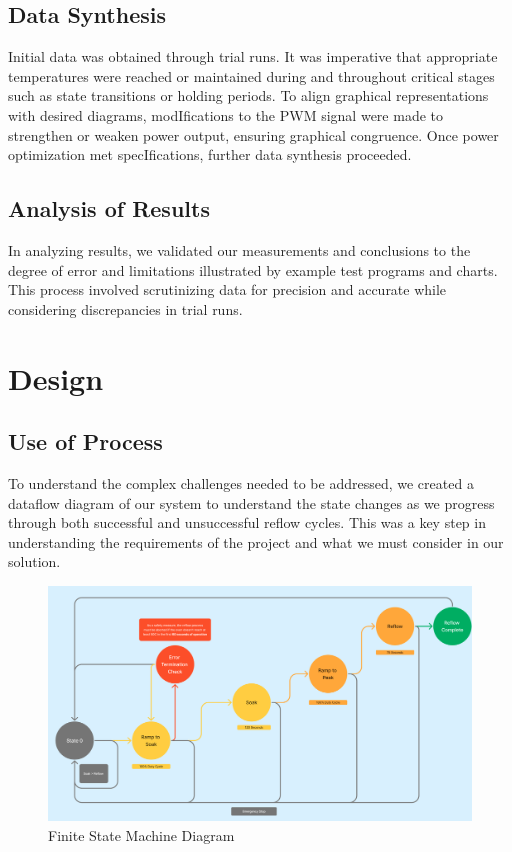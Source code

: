 \documentclass{article}
\begin{document}
\subsection{Data Synthesis}
Initial data was obtained through trial runs. It was imperative that appropriate temperatures were reached or maintained during and throughout critical stages such as state transitions or holding periods. To align graphical representations with desired diagrams, modIfications to the PWM signal were made to strengthen or weaken power output, ensuring graphical congruence. Once power optimization met specIfications, further data synthesis proceeded.

\subsection{Analysis of Results}
In analyzing results, we validated our measurements and conclusions to the degree of error and limitations illustrated by example test programs and charts. This process involved scrutinizing data for precision and accurate while considering discrepancies in trial runs.

\section{Design}

\subsection{Use of Process}
To understand the complex challenges needed to be addressed, we created a dataflow diagram of our system to understand the state changes as we progress through both
successful and unsuccessful reflow cycles. This was a key step in understanding the requirements of the project and what we must consider in our solution.

\begin{figure}[h]
        \centering
        \includegraphics[width=1\linewidth]{Figures/Statemachine.png}
        \caption{Finite State Machine Diagram}
        \label{fig:Statemachine}
\end{figure}
\end{document}
